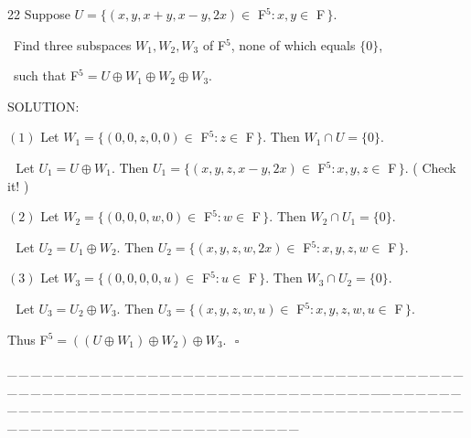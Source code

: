 \documentclass[a4paper, 11pt, UTF8]{article}
\begin{document}
\begin{large}
{\timesbf\Large 22} {\timessl\Large 
Suppose $U=\{(x,y,x+y,x-y,2x)\in$ {\timesbf F}$^5:x,y\in$ {\timesbf F}$\,\}$.}\par\quad\,
{\timessl\Large
Find three subspaces $W_1,W_2,W_3$ of {\timesbf F}$^5$, none of which equals $\{0\}$,}\par\quad\,
{\timessl\Large such that {\timesbf F}$^5 = U\oplus W_1\oplus W_2\oplus W_3 $.}\par
{\timesbf S\footnotesize{OLUTION:}}\par\quad
$(1)$ Let $W_1=\{(0,0,z,0,0)\in$ {\timesbf F}$^5:z\in$ {\timesbf F}$\,\}$. Then $W_1\cap U=\{0\}.$\par\qquad\,\,
Let $U_1=U\oplus W_1$. Then $U_1=\{(x,y,z,x-y,2x)\in$ {\timesbf F}$^5:x,y,z\in$ {\timesbf F}$\,\}$. ( Check it! )\par\quad
$(2)$ Let $W_2=\{(0,0,0,w,0)\in$ {\timesbf F}$^5:w\in$ {\timesbf F}$\,\}$. Then $W_2\cap U_1=\{0\}$.\par\qquad\,\,
Let $U_2=U_1\oplus W_2$. Then $U_2=\{(x,y,z,w,2x)\in$ {\timesbf F}$^5:x,y,z,w\in$ {\timesbf F}$\,\}$.\par\quad
$(3)$ Let $W_3=\{(0,0,0,0,u)\in$ {\timesbf F}$^5:u\in$ {\timesbf F}$\,\}$. Then $W_3\cap U_2=\{0\}$.\par\qquad\,\,
Let $U_3=U_2\oplus W_3$. Then $U_3=\{(x,y,z,w,u)\in$ {\timesbf F}$^5:x,y,z,w,u\in$ {\timesbf F}$\,\}$.\par\quad
Thus {\timesbf F}$^5=((U\oplus W_1)\oplus W_2)\oplus W_3.\,\,\,\,\square$\par
{\tiny \_\,\_\,\_\,\_\,\_\,\_\,\_\,\_\,\_\,\_\,\_\,\_\,\_\,\_\,\_\,\_\,\_\,\_\,\_\,\_\,\_\,\_\,\_\,\_\,\_\,\_\,\_\,\_\,\_\,\_\,\_\,\_\,\_\,\_\,\_\,\_\,\_\,\_\,\_\,\_\,\_\,\_\,\_\,\_\,\_\,\_\,\_\,\_\,\_\,\_\,\_\,\_\,\_\,\_\,\_\,\_\,\_\,\_\,\_\,\_\,\_\,\_\,\_\,\_\,\_\,\_\,\_\,\_\,\_\,\_\,\_\_\,\_\,\_\,\_\,\_\,\_\,\_\,\_\,\_\,\_\,\_\,\_\,\_\,\_\,\_\,\_\,\_\,\_\,\_\,\_\,\_\,\_\,\_\,\_\,\_\,\_\,\_\,\_\,\_\,\_\,\_\,\_\,\_\,\_\,\_\,\_\,\_\,\_\,\_\,\_\,\_\,\_\,\_\,\_\,\_\,\_\,\_\,\_\,\_\,\_\,\_\,\_\,\_\,\_\,\_\,\_\,\_\,\_\,\_\,\_\,\_\,\_\,\_\,\_\,\_\,\_\,\_\,\_\,\_\,\_\,\_}\par


\end{large}
\end{document}
